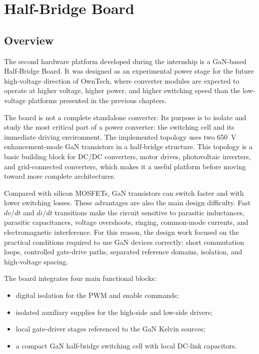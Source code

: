 \chapter{Half-Bridge Board}

\section{Overview}

The second hardware platform developed during the internship is a GaN-based
Half-Bridge Board. It was designed as an experimental power stage for the
future high-voltage direction of OwnTech, where converter modules are expected
to operate at higher voltage, higher power, and higher switching speed than the
low-voltage platforms presented in the previous chapters.

The board is not a complete standalone converter. Its purpose is to isolate and
study the most critical part of a power converter: the switching cell and its
immediate driving environment. The implemented topology uses two 650~V
enhancement-mode GaN transistors in a half-bridge structure. This topology is a
basic building block for DC/DC converters, motor drives, photovoltaic inverters,
and grid-connected converters, which makes it a useful platform before moving
toward more complete architectures.

Compared with silicon MOSFETs, GaN transistors can switch faster and with lower
switching losses. These advantages are also the main design difficulty. Fast
\(dv/dt\) and \(di/dt\) transitions make the circuit sensitive to parasitic
inductances, parasitic capacitances, voltage overshoots, ringing, common-mode
currents, and electromagnetic interference. For this reason, the design work
focused on the practical conditions required to use GaN devices correctly:
short commutation loops, controlled gate-drive paths, separated reference
domains, isolation, and high-voltage spacing.

The board integrates four main functional blocks:

\begin{itemize}
    \item digital isolation for the PWM and enable commands;
    \item isolated auxiliary supplies for the high-side and low-side drivers;
    \item local gate-driver stages referenced to the GaN Kelvin sources;
    \item a compact GaN half-bridge switching cell with local DC-link capacitors.
\end{itemize}

